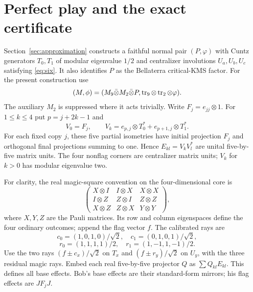 \section{Perfect play and the exact certificate}\label{sec:perfect}
Section~\ref{sec:approximation} constructs a faithful normal pair $(P,\varphi)$ with Cuntz generators $T_0,T_1$ of modular eigenvalue $1/2$ and centralizer involutions $U_a,U_b,U_c$ satisfying \eqref{eq:six}. It also identifies $P$ as the Bellaterra critical-KMS factor. For the present construction use
\[
 (M,\phi)=(M_9\bar\otimes M_2\bar\otimes P,
                 \operatorname{tr}_9\otimes\operatorname{tr}_2\otimes\varphi).
\]
The auxiliary $M_2$ is suppressed where it acts trivially. Write $F_j=e_{jj}\otimes1$. For $1\le k\le4$ put $p=j+2k-1$ and
\begin{equation}\label{eq:Vk}
 V_0=F_j,\qquad
 V_k=e_{p,j}\otimes T_0^*+e_{p+1,j}\otimes T_1^*.
\end{equation}
For each fixed copy $j$, these five partial isometries have initial projection $F_j$ and orthogonal final projections summing to one. Hence $E_{kl}=V_kV_l^*$ are unital five-by-five matrix units. The four nonflag corners are centralizer matrix units; $V_k$ for $k>0$ has modular eigenvalue two.

For clarity, the real magic-square convention on the four-dimensional core is
\[
 \begin{pmatrix}
 X\otimes I&I\otimes X&X\otimes X\\
 I\otimes Z&Z\otimes I&Z\otimes Z\\
 X\otimes Z&Z\otimes X&Y\otimes Y
 \end{pmatrix},
\]
where $X,Y,Z$ are the Pauli matrices. Its row and column eigenspaces define the four ordinary outcomes; append the flag vector $f$. The calibrated rays are
\[
 c_0=(1,0,1,0)/\sqrt2,\quad c_1=(0,1,0,1)/\sqrt2,
\]
\[
 r_0=(1,1,1,1)/2,\quad r_1=(1,-1,1,-1)/2.
\]
Use the two rays $(f\pm c_x)/\sqrt2$ on $T_x$ and $(f\pm r_y)/\sqrt2$ on $U_y$, with the three residual magic rays. Embed each real five-by-five projector $Q$ as $\sum Q_{kl}E_{kl}$. This defines all base effects. Bob's base effects are their standard-form mirrors; his flag effects are $JF_jJ$.

